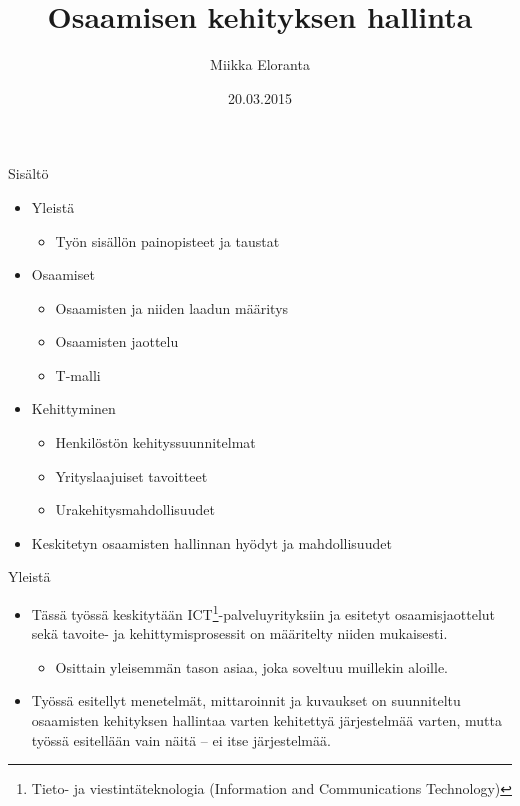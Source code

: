 \documentclass[first=purple,second=dblue,logo=redquo]{aaltoslides}
\title{Osaamisen kehityksen hallinta}
\author[M. Eloranta]{Miikka Eloranta}
\institute[AS]{Automaatio- ja systeemitekniikka\\
Sähkötekniikan korkeakoulu, Aalto-yliopisto}
\date{20.03.2015}
\begin{document}
\aaltotitleframe

\begin{frame}{Sisältö}
\begin{itemize}
\item Yleistä
\begin{itemize}
\item Työn sisällön painopisteet ja taustat
\end{itemize}
\item Osaamiset
\begin{itemize}
\item Osaamisten ja niiden laadun määritys
\item Osaamisten jaottelu
\item T-malli
\end{itemize}
\item Kehittyminen
\begin{itemize}
\item Henkilöstön kehityssuunnitelmat
\item Yrityslaajuiset tavoitteet
\item Urakehitysmahdollisuudet
\end{itemize}
\item Keskitetyn osaamisten hallinnan hyödyt ja mahdollisuudet
\end{itemize}
\end{frame}

\begin{frame}{Yleistä}
\begin{itemize}
\item Tässä työssä keskitytään ICT\footnote{\tiny{Tieto- ja viestintäteknologia (Information and Communications Technology)}}-palveluyrityksiin ja esitetyt osaamisjaottelut sekä tavoite- ja kehittymisprosessit on määritelty niiden mukaisesti.
\begin{itemize}
\item Osittain yleisemmän tason asiaa, joka soveltuu muillekin aloille.
\end{itemize}
\item Työssä esitellyt menetelmät, mittaroinnit ja kuvaukset on suunniteltu osaamisten kehityksen hallintaa varten kehitettyä järjestelmää varten, mutta työssä esitellään vain näitä -- ei itse järjestelmää.
\end{itemize}
\end{frame}
\end{document}
